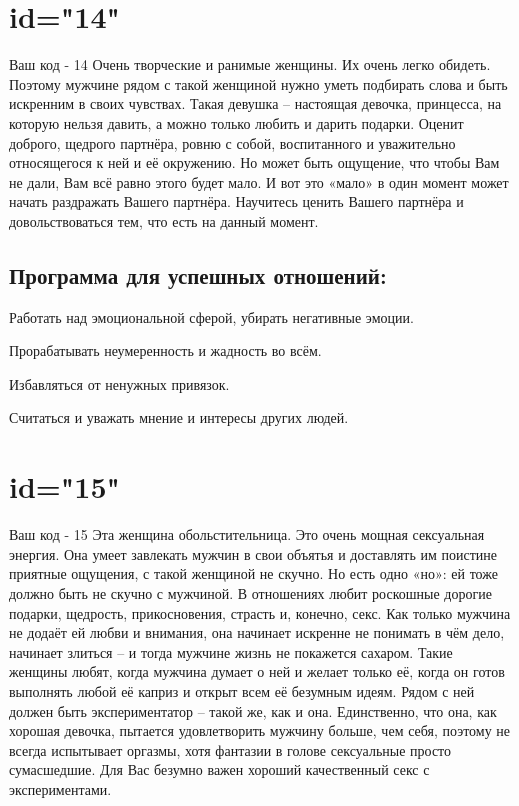 \section{id="14"}{Ваш код - 14}
Очень творческие и ранимые женщины. Их очень легко обидеть. Поэтому 
мужчине рядом с такой женщиной нужно уметь подбирать слова и быть 
искренним в своих чувствах. Такая девушка – настоящая девочка, 
принцесса, на которую нельзя давить, а можно только любить и дарить 
подарки. Оценит доброго, щедрого партнёра, ровню с собой, 
воспитанного и уважительно относящегося к ней и её окружению. Но 
может быть ощущение, что чтобы Вам не дали, Вам всё равно этого 
будет мало. И вот это «мало» в один момент может начать раздражать 
Вашего партнёра. Научитесь ценить Вашего партнёра и довольствоваться 
тем, что есть на данный момент.
\subsection{Программа для успешных отношений:}
\item Работать над эмоциональной сферой, убирать негативные эмоции.
\item Прорабатывать неумеренность и жадность во всём.
\item Избавляться от ненужных привязок.
\item Считаться и уважать мнение и интересы других людей.
\endsubsection
\endsection

\section{id="15"}{Ваш код - 15}
Эта женщина обольстительница. Это очень мощная сексуальная энергия. 
Она умеет завлекать мужчин в свои объятья и доставлять им поистине 
приятные ощущения, с такой женщиной не скучно. Но есть одно «но»: 
ей тоже должно быть не скучно с мужчиной. В отношениях любит роскошные 
дорогие подарки, щедрость, прикосновения, страсть и, конечно, секс. 
Как только мужчина не додаёт ей любви и внимания, она начинает 
искренне не понимать в чём дело, начинает злиться – и тогда мужчине 
жизнь не покажется сахаром. Такие женщины любят, когда мужчина думает 
о ней и желает только её, когда он готов выполнять любой её каприз 
и открыт всем её безумным идеям. Рядом с ней должен быть экспериментатор 
– такой же, как и она. Единственно, что она, как хорошая девочка, 
пытается удовлетворить мужчину больше, чем себя, поэтому не всегда 
испытывает оргазмы, хотя фантазии в голове сексуальные просто 
сумасшедшие. Для Вас безумно важен хороший качественный секс с 
экспериментами.

